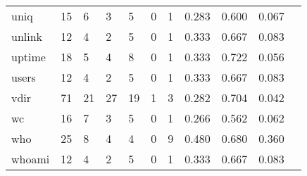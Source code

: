\begin{longtable}{lp{1.10cm}p{1.10cm}p{1.10cm}p{1.10cm}p{1.10cm}p{1.10cm}p{1.10cm}p{1.10cm}p{1.10cm}p{1.10cm}}
uniq      &                     15 &                                  6 &                                 3 &                                5 &                                 0 &                               1 &                          0.283 &                                 0.600 &                               0.067 \\
unlink    &                     12 &                                  4 &                                 2 &                                5 &                                 0 &                               1 &                          0.333 &                                 0.667 &                               0.083 \\
uptime    &                     18 &                                  5 &                                 4 &                                8 &                                 0 &                               1 &                          0.333 &                                 0.722 &                               0.056 \\
users     &                     12 &                                  4 &                                 2 &                                5 &                                 0 &                               1 &                          0.333 &                                 0.667 &                               0.083 \\
vdir      &                     71 &                                 21 &                                27 &                               19 &                                 1 &                               3 &                          0.282 &                                 0.704 &                               0.042 \\
wc        &                     16 &                                  7 &                                 3 &                                5 &                                 0 &                               1 &                          0.266 &                                 0.562 &                               0.062 \\
who       &                     25 &                                  8 &                                 4 &                                4 &                                 0 &                               9 &                          0.480 &                                 0.680 &                               0.360 \\
whoami    &                     12 &                                  4 &                                 2 &                                5 &                                 0 &                               1 &                          0.333 &                                 0.667 &                               0.083 \\

\end{longtable}
